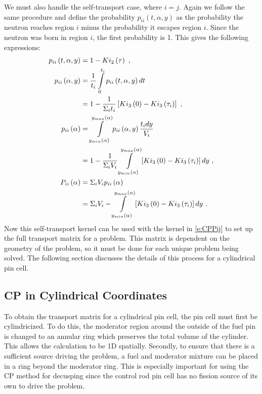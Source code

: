 We must also handle the self-transport case, where $i=j$.  Again we follow the same procedure and define the probability $p_{ii}\left(t, \alpha, y\right)$ as the probability the neutron reaches region $i$ minus the probability it escapes region $i$.  Since the neutron was born in region $i$, the first probability is 1.  This gives the following expressions:
\begin{subequations}\label{e:CPPii}
  \begin{align}
  p_{ii}\left(t,\alpha,y\right) &= 1 - Ki_2\left(\tau\right)\ , \\
  p_{ii}\left(\alpha,y\right) &= \frac{1}{t_i} \intop_0^{t_i} p_{ii}\left(t,\alpha,y\right) dt \nonumber \\
  &= 1- \frac{1}{\Sigma_i t_i} \left[Ki_3\left(0\right) - Ki_3\left(\tau_i\right)\right]\ , \\
  p_{ii}\left(\alpha\right) &= \intop_{y_{min}\left(\alpha\right)}^{y_{max}\left(\alpha\right)} p_{ii}\left(\alpha,y\right) \frac{t_i dy}{V_i} \nonumber\\
  &= 1 - \frac{1}{\Sigma_i V_i} \intop_{y_{min}\left(\alpha\right)}^{y_{max}\left(\alpha\right)} \left[Ki_3\left(0\right) - Ki_3\left(\tau_i\right)\right] dy\ , \\
  P_{ii}\left(\alpha\right) &= \Sigma_i V_i p_{ii}\left(\alpha\right) \nonumber \\
  &= \Sigma_i V_i - \intop_{y_{min}\left(\alpha\right)}^{y_{max}\left(\alpha\right)} \left[Ki_3\left(0\right) - Ki_3\left(\tau_i\right)\right] dy\ .
  \end{align}
\end{subequations}
Now this self-transport kernel can be used with the kernel in \ref{e:CPPij} to set up the full transport matrix for a problem.  This matrix is dependent on the geometry of the problem, so it must be done for each unique problem being solved.  The following section discusses the details of this process for a cylindrical pin cell.

\subsection{CP in Cylindrical Coordinates}\label{appsubsec:CPcylCoord}

To obtain the transport matrix for a cylindrical pin cell, the pin cell must first be cylindricized.  To do this, the moderator region around the outside of the fuel pin is changed to an annular ring which preserves the total volume of the cylinder.  This allows the calculation to be 1D spatially.  Secondly, to ensure that there is a sufficient source driving the problem, a fuel and moderator mixture can be placed in a ring beyond the moderator ring.  This is especially important for using the CP method for decusping since the control rod pin cell has no fission source of its own to drive the problem.

